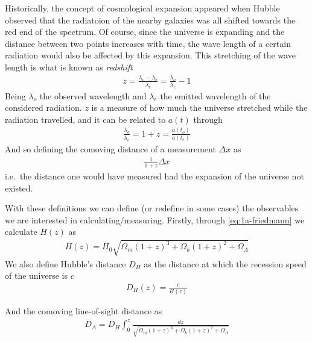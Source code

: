 Historically, the concept of cosmological expansion appeared when Hubble observed that the radiatoion of the nearby galaxies was all shifted towards the red end of the spectrum. Of course, since the universe is expanding and the distance between two points increases with time, the wave length of a certain radiation would also be affected by this expansion. This stretching of the wave length is what is known as \textit{redshift} 
\begin{align}
	z = \frac{\lambda_{\text{o}} - \lambda_{\text{e}}}{\lambda_{\text{e}}} = \frac{\lambda_o}{\lambda_e} - 1
	\label{eq:redshift}
\end{align}
Being $\lambda_o$ the observed wavelength and $\lambda_e$ the emitted wavelength of the considered radiation. $z$ is a measure of how much the universe stretched while the radiation travelled, and it can be related to $a(t)$ through 
\begin{align}
	\frac{\lambda_o}{\lambda_e} = 1+z = \frac{a(t_o)}{a(t_e)}
\end{align}
And so defining the comoving distance of a measurement $\Delta x$ as 
\begin{align}
	\frac{1}{1+z}\Delta x
\end{align}
i.e.\ the distance one would have measured had the expansion of the universe not existed.

With these definitions we can define (or redefine in some cases) the observables we are interested in calculating/measuring. Firstly, through \eqref{eq:1a-friedmann} we calculate $H(z)$ as  
\begin{align}
	H(z) = H_0 \sqrt{\Omega_m(1+z)^3 + \Omega_k(1+z)^2 + \Omega_\Lambda} 
\end{align}
We also define Hubble's distance $D_H$ as the distance at which the recession speed of the universe is $c$ 
\begin{align}
	D_H(z)  = \frac{c}{H(z)}
\end{align}

And the comoving line-of-sight distance as 
\begin{align}
	D_A = D_H\int_{0}^{z} \frac{dz}{\sqrt{\Omega_m(1+z)^3 + \Omega_k(1+z)^2 + \Omega_\Lambda} } 
\end{align}
